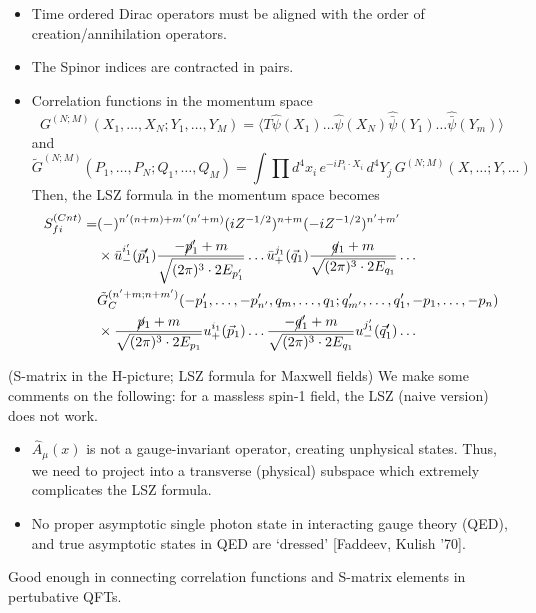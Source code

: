 \vspace{2ex}
\begin{rmk}
\begin{itemize}
\item[(i)] Time ordered Dirac operators must be aligned with the order of creation/annihilation operators. 
\item[(ii)] The Spinor indices are contracted in pairs. 
\item[(iii)] Correlation functions in the momentum space 
\[G^{(N;M)}(X_1,\ldots ,X_{N};Y_1,\ldots ,Y_{M})=\langle T\hat{\psi }(X_1)\ldots \hat{\psi }(X_{N})\hat{\bar{\psi }}(Y_1)\ldots \hat{\bar{\psi }}(Y_{m})\rangle \]
and
\[\tilde{G}^{(N;M)}(P_1,\ldots ,P_{N};Q_1,\ldots ,Q_{M})=\int \prod d^{4}x_{i}\,e^{-iP_{i}\cdot X_{i}}\,d^{4}Y_{j}\,G^{(N;M)}(X,\ldots ;Y,\ldots )\]
Then, the LSZ formula in the momentum space becomes
\[\begin{align*}
S^{(Cnt)}_{fi}=&(-)^{n'(n+m)+m'(n'+m)}(iZ^{-1/2})^{n+m}(-iZ^{-1/2})^{n'+m'}\\
&\times \bar{u}_{-}^{i_{1}'}(\vec{p}_{1}')\dfrac{-\cancel{p}_{1}'+m}{\sqrt{(2\pi )^3\cdot 2E_{p'_{1}}}}\ldots \bar{u}_{+}^{j_{1}}(\vec{q}_{1})\dfrac{\cancel{q}_{1}+m}{\sqrt{(2\pi )^3\cdot 2E_{q_1}}}\ldots \\
&\tilde{G}_{C}^{(n'+m;n+m')}(-p_1',\ldots ,-p'_{n'},q_{m},\ldots ,q_{1};q'_{m'},\ldots ,q'_{1},-p_1,\ldots ,-p_{n})\\
&\times \dfrac{\cancel{p}_{1}+m}{\sqrt{(2\pi )^3\cdot 2E_{p_1}}}u^{i_1}_{+}(\vec{p}_{1})\ldots \dfrac{-\cancel{q}_{1}'+m}{\sqrt{(2\pi )^3\cdot 2E_{q_{1}}}}u_{-}^{j_{1}'}(\vec{q}_{1}')\ldots 
\end{align*}\]
\end{itemize}
\end{rmk}
\vspace{2ex}
\begin{rmk}
(S-matrix in the H-picture; LSZ formula for Maxwell fields) We make some comments on the following: for a massless spin-1 field, the LSZ (naive version) does not work. 
\begin{itemize}
\item[(i)] $\hat{A}_{\mu }(x)$ is not a gauge-invariant operator, creating unphysical states. Thus, we need to project into a transverse (physical) subspace which extremely complicates the LSZ formula. 
\item[(ii)] No proper asymptotic single photon state in interacting gauge theory (QED), and true asymptotic states in QED are `dressed' [Faddeev, Kulish '70]. 
\end{itemize}
Good enough in connecting correlation functions and S-matrix elements in pertubative QFTs. 
\end{rmk}

